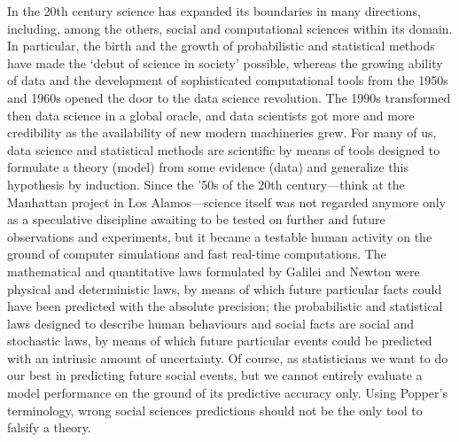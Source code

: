 \documentclass{statsoc}
\begin{document}
In the 20th century science has expanded its boundaries in many directions, including, among the others, social and computational sciences within its domain. In particular, the birth 
and the growth of probabilistic and statistical methods have made the `debut of science in society' possible, whereas the growing ability of data and the development of sophisticated computational 
tools from the 1950s and 1960s opened the door to the data science revolution. The 1990s transformed then data science in a 
global oracle, and data scientists got more and more credibility as the availability of new modern machineries grew.    For many of us, data science and statistical methods 
are scientific by means of tools designed to formulate a theory (model) from some evidence (data) and generalize this hypothesis by induction. Since the '50s of the 20th century---think at the Manhattan project in Los Alamos---science itself was not regarded anymore only as a speculative discipline awaiting to be tested on 
further and future observations and experiments, but it became a testable human activity on the ground of computer simulations and fast real-time computations.  
 The mathematical and quantitative laws formulated by Galilei and Newton 
were physical and deterministic laws, by means of which future particular facts could have been predicted with the absolute precision; the probabilistic and statistical laws designed 
to describe human behaviours and social facts are social and stochastic laws, by means of which future particular events could be predicted with an intrinsic amount of uncertainty. Of course, as statisticians we want to do our best in predicting future social events, but we cannot entirely evaluate a model performance on the ground of its predictive accuracy only. Using Popper's terminology, wrong social sciences predictions should not be the only tool to falsify a theory.



\end{document}
